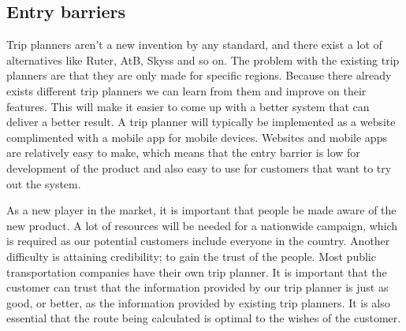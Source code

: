 \subsection{Entry barriers}
Trip planners aren't a new invention by any standard, and there exist a lot of alternatives like Ruter, AtB, Skyss and so on. The problem with the existing trip planners are that they are only made for specific regions.
Because there already exists different trip planners we can learn from them and improve on their features. This will make it easier to come up with a better system that can deliver a better result.
A trip planner will typically be implemented as a website complimented with a mobile app for mobile devices.
Websites and mobile apps are relatively easy to make, which means that the entry barrier is low for development of the product and also easy to use for customers that want to try out the system.

As a new player in the market, it is important that people be made aware of the new product. A lot of resources will be needed for a nationwide campaign, which is required as our potential customers include everyone in the country.
Another difficulty is attaining credibility; to gain the trust of the people.
Most public transportation companies have their own trip planner. It is important that the customer can trust that the information provided by our trip planner is just as good, or better, as the information provided by existing trip planners.
It is also essential that the route being calculated is optimal to the wishes of the customer. 